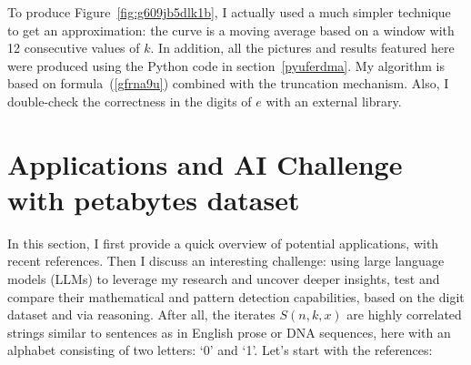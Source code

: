 \documentclass[10pt]{article}
\begin{document}
To produce Figure~\ref{fig:g609jb5dlk1b}, I actually used a much simpler technique to get an approximation: the curve is a moving average based on a window with 12 consecutive values of $k$. In addition, all the pictures and results featured here were produced using the Python code
 in section~\ref{pyuferdma}.  
 My algorithm is  based on formula~(\ref{gfrna9u}) combined with the truncation mechanism. 
Also, I double-check the correctness in the digits of $e$ with an external library. 




\section{Applications and AI Challenge with petabytes dataset}

In this section, I first provide a quick overview of potential applications, 
with recent references. Then I discuss an interesting challenge: using
\textcolor{index}{large language models} (LLMs) to leverage my research and uncover deeper insights, test and compare their mathematical and pattern detection capabilities, based on the digit dataset and via reasoning. After all, the iterates
 $S(n, k, x)$ are highly correlated strings similar to sentences as in English prose or DNA sequences, 
here with an alphabet consisting of two letters: `0' and `1'. Let's start with the references: 
\vspace{1ex}
\end{document}
